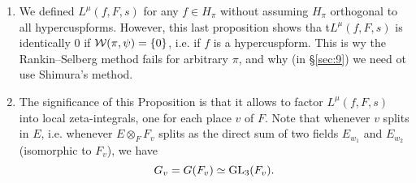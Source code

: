 \begin{remark*}
\begin{enumerate}[label=(\roman*)]
    \item We defined $L^\mu(f, F, s)$ for any $f \in H_\pi$ without assuming $H_\pi$ orthogonal to all hypercuspforms.
    However, this last proposition shows tha t$L^\mu(f, F, s)$ is identically $0$ if $\mathcal{W}(\pi, \psi) =\{0\}$, i.e. if $f$ is a hypercuspform.
    This is wy the Rankin--Selberg method fails for arbitrary $\pi$, and why (in \S \ref{sec:9}) we need ot use Shimura's method.
    \item The significance of this Proposition is that it allows to factor $L^\mu(f, F, s)$ into local zeta-integrals, one for each place $v$ of $F$.
    Note that whenever $v$ splits in $E$, i.e. whenever $E\otimes_F F_v$ splits as the direct sum of two fields $E_{w_1}$ and $E_{w_2}$ (isomorphic to $F_v$), we have
    \[
        G_v = G(F_v) \simeq \mathrm{GL}_3(F_v).
    \]
\end{enumerate} 
\end{remark*}